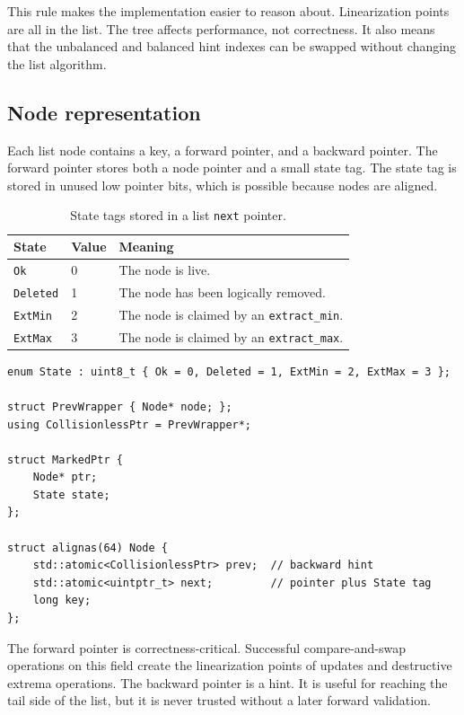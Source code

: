\documentclass[a4paper,11pt]{article}
\newcommand{\code}[1]{\texttt{#1}}
\begin{document}
This rule makes the implementation easier to reason about. Linearization points are all in the list. The tree affects performance, not correctness. It also means that the unbalanced and balanced hint indexes can be swapped without changing the list algorithm.

\subsection{Node representation}

Each list node contains a key, a forward pointer, and a backward pointer. The forward pointer stores both a node pointer and a small state tag. The state tag is stored in unused low pointer bits, which is possible because nodes are aligned.

\begin{table}[H]
\centering
\caption{State tags stored in a list \code{next} pointer.}
\label{tab:states}
\begin{tabular}{lll}
\toprule
State & Value & Meaning \\
\midrule
\code{Ok} & 0 & The node is live. \\
\code{Deleted} & 1 & The node has been logically removed. \\
\code{ExtMin} & 2 & The node is claimed by an \code{extract\_min}. \\
\code{ExtMax} & 3 & The node is claimed by an \code{extract\_max}. \\
\bottomrule
\end{tabular}
\end{table}

\begin{lstlisting}[style=cpp,caption={Simplified list-node layout.}]
enum State : uint8_t { Ok = 0, Deleted = 1, ExtMin = 2, ExtMax = 3 };

struct PrevWrapper { Node* node; };
using CollisionlessPtr = PrevWrapper*;

struct MarkedPtr {
    Node* ptr;
    State state;
};

struct alignas(64) Node {
    std::atomic<CollisionlessPtr> prev;  // backward hint
    std::atomic<uintptr_t> next;         // pointer plus State tag
    long key;
};
\end{lstlisting}

The forward pointer is correctness-critical. Successful compare-and-swap operations on this field create the linearization points of updates and destructive extrema operations. The backward pointer is a hint. It is useful for reaching the tail side of the list, but it is never trusted without a later forward validation.
\end{document}
